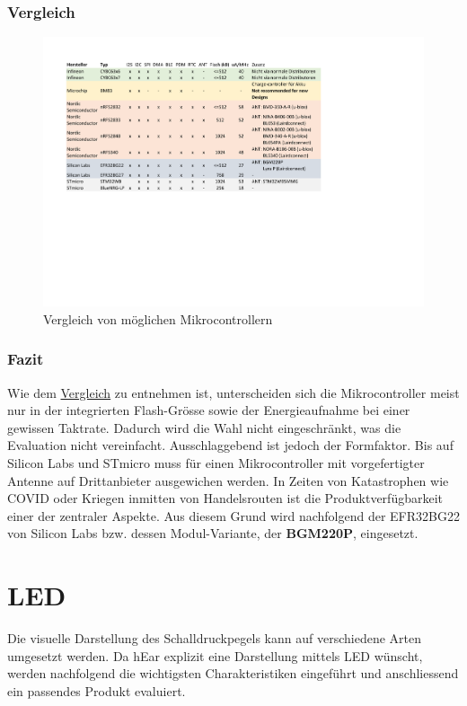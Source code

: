 \documentclass[12pt]{article}
\begin{document}
	\subsubsection{Vergleich} \label{Vergleich_uC}
	\begin{figure}[H]
		\centering
		\includegraphics[trim=55 260 230 70, width=1\linewidth]{tables/BAT_Vergleich-Mikrocontroller}
		\caption{Vergleich von möglichen Mikrocontrollern}
		\label{fig:batvergleich-mikrocontroller}
	\end{figure}
	\subsubsection{Fazit}
	Wie dem \hyperref[Vergleich_uC]{Vergleich} zu entnehmen ist, unterscheiden sich die Mikrocontroller meist nur in der integrierten Flash-Grösse sowie der Energieaufnahme bei einer gewissen Taktrate. Dadurch wird die Wahl nicht eingeschränkt, was die Evaluation nicht vereinfacht. Ausschlaggebend ist jedoch der Formfaktor. Bis auf Silicon Labs und STmicro muss für einen Mikrocontroller mit vorgefertigter Antenne auf Drittanbieter ausgewichen werden. In Zeiten von Katastrophen wie COVID oder Kriegen inmitten von Handelsrouten ist die Produktverfügbarkeit einer der zentraler Aspekte. Aus diesem Grund wird nachfolgend der EFR32BG22 von Silicon Labs bzw. dessen Modul-Variante, der \textbf{BGM220P}, eingesetzt.
	
	\newpage
	\section{LED}\label{LED}
	Die visuelle Darstellung des Schalldruckpegels kann auf verschiedene Arten umgesetzt werden. Da hEar explizit eine Darstellung mittels LED wünscht, werden nachfolgend die wichtigsten Charakteristiken eingeführt und anschliessend ein passendes Produkt evaluiert.
\end{document}
